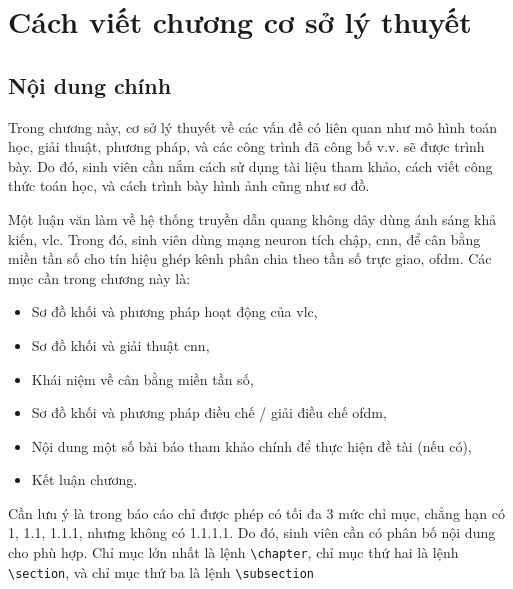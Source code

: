 \section{Cách viết chương cơ sở lý thuyết}
	
	\subsection{Nội dung chính}
	
	Trong chương này, cơ sở lý thuyết về các vấn đề có liên quan như mô hình toán học, giải thuật, phương pháp, và các công trình đã công bố v.v. sẽ được trình bày.
	Do đó, sinh viên cần nắm cách sử dụng tài liệu tham khảo, cách viết công thức toán học, và cách trình bày hình ảnh cũng như sơ đồ.
	
	\begin{exam}
	Một luận văn làm về hệ thống truyền dẫn quang không dây dùng ánh sáng khả kiến, \ac{vlc}. Trong đó, sinh viên dùng mạng neuron tích chập, \ac{cnn}, để cân bằng miền tần số cho tín hiệu ghép kênh phân chia theo tần số trực giao, \ac{ofdm}. Các mục cần trong chương này là: 
		\begin{itemize}
			\item Sơ đồ khối và phương pháp hoạt động của \ac{vlc}, 
			\item Sơ đồ khối và giải thuật \ac{cnn}, 
			\item Khái niệm về cân bằng miền tần số, 
			\item Sơ đồ khối và phương pháp điều chế / giải điều chế \ac{ofdm},	
			\item Nội dung một số bài báo tham khảo chính để thực hiện đề tài (nếu có),
			\item Kết luận chương.
		\end{itemize}
	\end{exam}
	
	Cần lưu ý là trong báo cáo chỉ được phép có tối đa 3 mức chỉ mục, chẳng hạn có 1, 1.1, 1.1.1, nhưng không có 1.1.1.1.
	Do đó, sinh viên cần có phân bố nội dung cho phù hợp.
	Chỉ mục lớn nhất là lệnh \verb|\chapter|, chỉ mục thứ hai là lệnh \verb|\section|, và chỉ mục thứ ba là lệnh \verb|\subsection|

